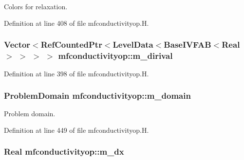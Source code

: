 Colors for relaxation. 



Definition at line 408 of file mfconductivityop.\+H.

\subsubsection[{\texorpdfstring{m\+\_\+dirival}{m_dirival}}]{\setlength{\rightskip}{0pt plus 5cm}Vector$<$Ref\+Counted\+Ptr$<$Level\+Data$<$Base\+I\+V\+F\+AB$<$Real$>$ $>$ $>$ $>$ mfconductivityop\+::m\+\_\+dirival\hspace{0.3cm}{\ttfamily [protected]}}\hypertarget{classmfconductivityop_a1164b11645550612dfcf9ee111177669}{}\label{classmfconductivityop_a1164b11645550612dfcf9ee111177669}


Definition at line 398 of file mfconductivityop.\+H.

\subsubsection[{\texorpdfstring{m\+\_\+domain}{m_domain}}]{\setlength{\rightskip}{0pt plus 5cm}Problem\+Domain mfconductivityop\+::m\+\_\+domain\hspace{0.3cm}{\ttfamily [protected]}}\hypertarget{classmfconductivityop_a81af5abd904311676580b75924abfda1}{}\label{classmfconductivityop_a81af5abd904311676580b75924abfda1}


Problem domain. 



Definition at line 449 of file mfconductivityop.\+H.

\subsubsection[{\texorpdfstring{m\+\_\+dx}{m_dx}}]{\setlength{\rightskip}{0pt plus 5cm}Real mfconductivityop\+::m\+\_\+dx\hspace{0.3cm}{\ttfamily [protected]}}\hypertarget{classmfconductivityop_ab601f3f001b6fee6c70732cc830c69d6}{}\label{classmfconductivityop_ab601f3f001b6fee6c70732cc830c69d6}


